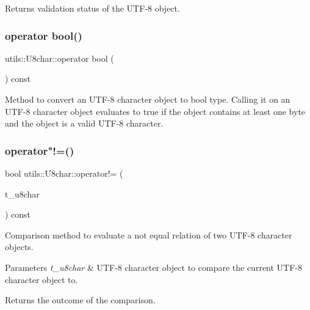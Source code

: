 \begin{DoxyReturn}{Returns}
validation status of the U\+T\+F-\/8 object. 
\end{DoxyReturn}
\mbox{\label{classutils_1_1U8char_a09e51153dd354d8c33607401a52caf71}} 
\subsubsection{\texorpdfstring{operator bool()}{operator bool()}}
{\footnotesize\ttfamily utils\+::\+U8char\+::operator bool (\begin{DoxyParamCaption}{ }\end{DoxyParamCaption}) const}

Method to convert an U\+T\+F-\/8 character object to bool type. Calling it on an U\+T\+F-\/8 character object evaluates to true if the object contains at least one byte and the object is a valid U\+T\+F-\/8 character. \mbox{\label{classutils_1_1U8char_ae51350fc92e66cfb9ac5784e483f4c59}} 
\subsubsection{\texorpdfstring{operator"!=()}{operator!=()}}
{\footnotesize\ttfamily bool utils\+::\+U8char\+::operator!= (\begin{DoxyParamCaption}\item[{\hyperlink{classutils_1_1U8char}{U8char} const \&}]{t\+\_\+u8char }\end{DoxyParamCaption}) const}

Comparison method to evaluate a \textquotesingle{}not equal\textquotesingle{} relation of two U\+T\+F-\/8 character objects. 
\begin{DoxyParams}{Parameters}
{\em t\+\_\+u8char} & U\+T\+F-\/8 character object to compare the current U\+T\+F-\/8 character object to. \\
\hline
\end{DoxyParams}
\begin{DoxyReturn}{Returns}
the outcome of the comparison. 
\end{DoxyReturn}
\mbox{\label{classutils_1_1U8char_aafa1ab43156a534f3d450772b0833b98}} 
